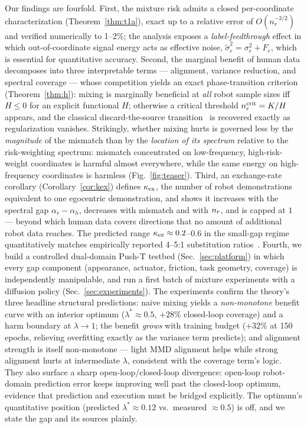 Our findings are fourfold.
First, the mixture risk admits a closed per-coordinate characterization (Theorem~\ref{thm:t1a}), exact up to a relative error of $O(n_r^{-3/2})$ and verified numerically to 1--2\%; the analysis exposes a \emph{label-feedthrough} effect in which out-of-coordinate signal energy acts as effective noise, $\tilde\sigma_e^2 = \sigma_e^2 + F_e$, which is essential for quantitative accuracy.
Second, the marginal benefit of human data decomposes into three interpretable terms --- alignment, variance reduction, and spectral coverage --- whose competition yields an exact phase-transition criterion (Theorem~\ref{thm:h}): mixing is marginally beneficial at \emph{all} robot sample sizes iff $H \le 0$ for an explicit functional $H$; otherwise a critical threshold $n_r^{\mathrm{crit}} = K/H$ appears, and the classical discard-the-source transition~\cite{bendavid2010theory} is recovered exactly as regularization vanishes.
Strikingly, whether mixing hurts is governed less by the \emph{magnitude} of the mismatch than by the \emph{location of its spectrum} relative to the risk-weighting spectrum: mismatch concentrated on low-frequency, high-risk-weight coordinates is harmful almost everywhere, while the same energy on high-frequency coordinates is harmless (Fig.~\ref{fig:teaser}).
Third, an exchange-rate corollary (Corollary~\ref{cor:kex}) defines $\kappa_{\mathrm{ex}}$, the number of robot demonstrations equivalent to one egocentric demonstration, and shows it increases with the spectral gap $\alpha_r - \alpha_h$, decreases with mismatch and with $n_r$, and is capped at $1$ --- beyond which human data covers directions that no amount of additional robot data reaches.
The predicted range $\kappa_{\mathrm{ex}} \approx 0.2$--$0.6$ in the small-gap regime quantitatively matches empirically reported 4--5:1 substitution ratios~\cite{zevaego2025}.
Fourth, we build a controlled dual-domain Push-T testbed (Sec.~\ref{sec:platform}) in which every gap component (appearance, actuator, friction, task geometry, coverage) is independently manipulable, and run a first batch of mixture experiments with a diffusion policy (Sec.~\ref{sec:experiments}).
The experiments confirm the theory's three headline structural predictions: naive mixing yields a \emph{non-monotone} benefit curve with an interior optimum ($\lambda^* \approx 0.5$, $+28\%$ closed-loop coverage) and a harm boundary at $\lambda \to 1$; the benefit \emph{grows} with training budget ($+32\%$ at 150 epochs, relieving overfitting exactly as the variance term predicts); and alignment strength is itself non-monotone --- light MMD alignment helps while strong alignment hurts at intermediate $\lambda$, consistent with the coverage term's logic.
They also surface a sharp open-loop/closed-loop divergence: open-loop robot-domain prediction error keeps improving well past the closed-loop optimum, evidence that prediction and execution must be bridged explicitly.
The optimum's quantitative position (predicted $\lambda^* \approx 0.12$ vs.\ measured $\approx 0.5$) is off, and we state the gap and its sources plainly.

